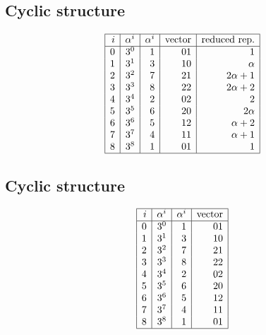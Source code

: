 \documentclass[12pt]{article}
\begin{document}
{\subsection*{Cyclic structure}
$$
\begin{array}{|r|r|r|r|r|}
\hline
i & \alpha^i & \alpha^i & \mbox{vector}& \mbox{reduced rep.}\\
\hline
0 & 3^{0} & 1 & 01 &   1\\
1 & 3^{1} & 3 & 10 & \alpha\\
2 & 3^{2} & 7 & 21 &   2\alpha +   1\\
3 & 3^{3} & 8 & 22 &   2\alpha +   2\\
4 & 3^{4} & 2 & 02 &   2\\
5 & 3^{5} & 6 & 20 &   2\alpha\\
6 & 3^{6} & 5 & 12 & \alpha +   2\\
7 & 3^{7} & 4 & 11 & \alpha +   1\\
8 & 3^{8} & 1 & 01 &   1\\
\hline
\end{array}
$$
\subsection*{Cyclic structure}
$$
\begin{array}{|r|r|r|r|}
\hline
i & \alpha^i & \alpha^i & \mbox{vector}\\
\hline
0 & 3^{0} & 1 & 01\\
1 & 3^{1} & 3 & 10\\
2 & 3^{2} & 7 & 21\\
3 & 3^{3} & 8 & 22\\
4 & 3^{4} & 2 & 02\\
5 & 3^{5} & 6 & 20\\
6 & 3^{6} & 5 & 12\\
7 & 3^{7} & 4 & 11\\
8 & 3^{8} & 1 & 01\\
\hline
\end{array}
$$


%


%


}%
\end{document}
